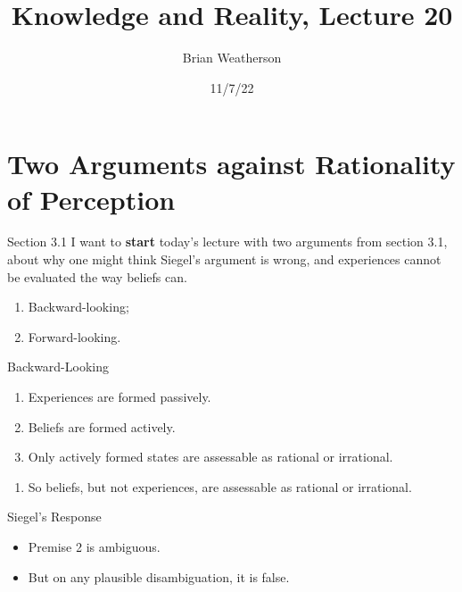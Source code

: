 \documentclass[
  17pt,
  letterpaper,
  ignorenonframetext,
  aspectratio=169,
  handout,
  xcolor={dvipsnames}]{beamer}
\title{Knowledge and Reality, Lecture 20}
\author{Brian Weatherson}
\date{11/7/22}
\providecommand{\tightlist}{%
  \setlength{\itemsep}{0pt}\setlength{\parskip}{0pt}}\usepackage{longtable,booktabs,array}
\begin{document}
\frame{\titlepage}
\ifdefined\Shaded\renewenvironment{Shaded}{\begin{tcolorbox}[borderline west={3pt}{0pt}{shadecolor}, interior hidden, enhanced, frame hidden, breakable, boxrule=0pt, sharp corners]}{\end{tcolorbox}}\fi

\hypertarget{two-arguments-against-rationality-of-perception}{%
\section{Two Arguments against Rationality of
Perception}\label{two-arguments-against-rationality-of-perception}}

\begin{frame}{Section 3.1}
\protect\hypertarget{section-3.1}{}
I want to \textbf{start} today's lecture with two arguments from section
3.1, about why one might think Siegel's argument is wrong, and
experiences cannot be evaluated the way beliefs can.

\begin{enumerate}[<+->]
\tightlist
\item
  Backward-looking;
\item
  Forward-looking.
\end{enumerate}
\end{frame}

\begin{frame}{Backward-Looking}
\protect\hypertarget{backward-looking}{}
\begin{enumerate}[<+->]
\tightlist
\item
  Experiences are formed passively.
\item
  Beliefs are formed actively.
\item
  Only actively formed states are assessable as rational or irrational.
\end{enumerate}

\begin{enumerate}[<+->]
[A.]
\setcounter{enumi}{2}
\tightlist
\item
  So beliefs, but not experiences, are assessable as rational or
  irrational.
\end{enumerate}
\end{frame}

\begin{frame}{Siegel's Response}
\protect\hypertarget{siegels-response}{}
\begin{itemize}[<+->]
\tightlist
\item
  Premise 2 is ambiguous.
\item
  But on any plausible disambiguation, it is false.
\end{itemize}
\end{frame}
\end{document}
